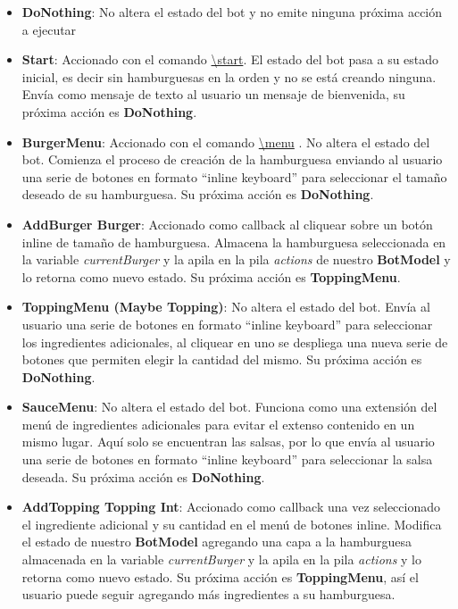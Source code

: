 \documentclass[a4paper,12pt]{article}
\begin{document}
\begin{itemize}
	\item 
	\textbf{DoNothing}: No altera el estado del bot y no emite ninguna próxima acción a ejecutar
	
	\item
	\textbf{Start}: Accionado con el comando 
	\color{blue}\uline{\textbackslash start}\color{black}. 
	El estado del bot pasa a su estado inicial, es decir sin hamburguesas en la orden y no se está creando ninguna. Envía como mensaje de texto al usuario un mensaje de bienvenida, su próxima acción es \textbf{DoNothing}.
	
	\item
	\textbf{BurgerMenu}: Accionado con el comando 
	\color{blue}\uline{\textbackslash menu}\color{black}
	. No altera el estado del bot. Comienza el proceso de creación de la hamburguesa enviando al usuario una serie de botones en formato “inline keyboard” para seleccionar el tamaño deseado de su hamburguesa. Su próxima acción es \textbf{DoNothing}.
	
	\item
	\textbf{AddBurger  \color{blue}Burger\color{black}}: Accionado como callback al cliquear sobre un botón inline de tamaño de hamburguesa. Almacena la hamburguesa seleccionada en la variable \textit{currentBurger} y la apila en la pila \textit{actions} de nuestro \textbf{BotModel} y lo retorna como nuevo estado.  Su próxima acción es \textbf{ToppingMenu}.
	
	\item
	\textbf{ToppingMenu \color{blue}(Maybe Topping)\color{black}}: No altera el estado del bot. Envía al usuario una serie de botones en formato “inline keyboard” para seleccionar los ingredientes adicionales, al cliquear en uno se despliega una nueva serie de botones que permiten elegir la cantidad del mismo. Su próxima acción es \textbf{DoNothing}.
	
	\item
	\textbf{SauceMenu}: No altera el estado del bot. Funciona como una extensión del menú de ingredientes adicionales para evitar el extenso contenido en un mismo lugar. Aquí solo se encuentran las salsas, por lo que envía al usuario una serie de botones en formato “inline keyboard” para seleccionar la salsa deseada. Su próxima acción es \textbf{DoNothing}.
	
	\item
	\textbf{AddTopping \color{blue}Topping Int\color{black}}: Accionado como callback una vez seleccionado el ingrediente adicional y su cantidad en el menú de botones inline. Modifica el estado de nuestro \textbf{BotModel} agregando una capa a la hamburguesa almacenada en la variable \textit{currentBurger} y la apila en la pila \textit{actions} y lo retorna como nuevo estado. Su próxima acción es \textbf{ToppingMenu}, así el usuario puede seguir agregando más ingredientes a su hamburguesa.
	

\end{itemize}
\end{document}
